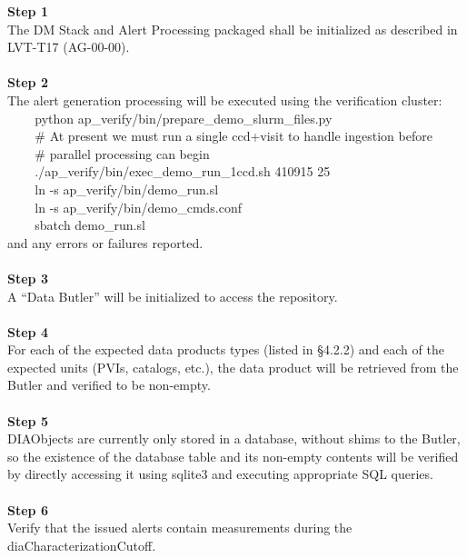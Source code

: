 \textbf{Step 1}\\
The DM Stack and Alert Processing packaged shall be initialized as
described in LVT-T17 (AG-00-00).\\
~\\
\textbf{Step 2}\\
The alert generation processing will be executed using the verification
cluster:\\
\hspace*{0.333em} ~ ~ ~python
ap\_verify/bin/prepare\_demo\_slurm\_files.py\\
\hspace*{0.333em} ~ ~ ~\# At present we must run a single ccd+visit to
handle ingestion before\\
\hspace*{0.333em} ~ ~ ~\# parallel processing can begin\\
\hspace*{0.333em} ~ ~ ~./ap\_verify/bin/exec\_demo\_run\_1ccd.sh 410915
25\\
\hspace*{0.333em} ~ ~ ~ln -s ap\_verify/bin/demo\_run.sl\\
\hspace*{0.333em} ~ ~ ~ln -s ap\_verify/bin/demo\_cmds.conf\\
\hspace*{0.333em} ~ ~ ~sbatch demo\_run.sl\\
and any errors or failures reported.\\
~\\
\textbf{Step 3}\\
A ``Data Butler'' will be initialized to access the repository.\\
~\\
\textbf{Step 4}\\
For each of the expected data products types (listed in §4.2.2) and each
of the expected units (PVIs, catalogs, etc.), the data product will be
retrieved from the Butler and verified to be non-empty.\\
~\\
\textbf{Step 5}\\
DIAObjects are currently only stored in a database, without shims to the
Butler, so the existence of the database table and its non-empty
contents will be verified by directly accessing it using sqlite3 and
executing appropriate SQL queries.\\
~\\
\textbf{Step 6}\\
Verify that the issued alerts contain measurements during the
diaCharacterizationCutoff.\\
~\\

